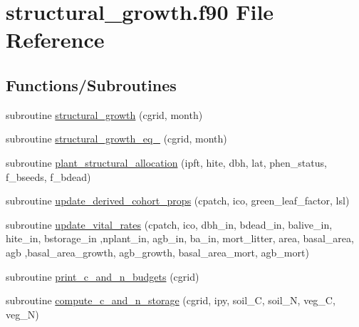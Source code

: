 \hypertarget{structural__growth_8f90}{}\section{structural\+\_\+growth.\+f90 File Reference}
\label{structural__growth_8f90}
\subsection*{Functions/\+Subroutines}
\begin{DoxyCompactItemize}
\item 
subroutine \hyperlink{structural__growth_8f90_a7026b36ce655ecfb0b39b37725e7cba0}{structural\+\_\+growth} (cgrid, month)
\item 
subroutine \hyperlink{structural__growth_8f90_ab7a103c1eca3dc4a1e6646ae50385192}{structural\+\_\+growth\+\_\+eq\+\_} (cgrid, month)
\item 
subroutine \hyperlink{structural__growth_8f90_aeb0b1265e38d3c5ca8e55da40e42dae2}{plant\+\_\+structural\+\_\+allocation} (ipft, hite, dbh, lat, phen\+\_\+status, f\+\_\+bseeds, f\+\_\+bdead)
\item 
subroutine \hyperlink{structural__growth_8f90_a536c2986535dd42c3f2fd77510acf2f3}{update\+\_\+derived\+\_\+cohort\+\_\+props} (cpatch, ico, green\+\_\+leaf\+\_\+factor, lsl)
\item 
subroutine \hyperlink{structural__growth_8f90_a18746b03d74909fea238e464b0f7f513}{update\+\_\+vital\+\_\+rates} (cpatch, ico, dbh\+\_\+in, bdead\+\_\+in, balive\+\_\+in, hite\+\_\+in, bstorage\+\_\+in                                                                                                                               ,nplant\+\_\+in, agb\+\_\+in, ba\+\_\+in, mort\+\_\+litter, area, basal\+\_\+area, agb                                                                                                                                       ,basal\+\_\+area\+\_\+growth, agb\+\_\+growth, basal\+\_\+area\+\_\+mort, agb\+\_\+mort)
\item 
subroutine \hyperlink{structural__growth_8f90_a7f0c8e66b7972204c83052c3968c4bff}{print\+\_\+c\+\_\+and\+\_\+n\+\_\+budgets} (cgrid)
\item 
subroutine \hyperlink{structural__growth_8f90_a5e03a88fee4cb247574e235c96e27716}{compute\+\_\+c\+\_\+and\+\_\+n\+\_\+storage} (cgrid, ipy, soil\+\_\+C, soil\+\_\+N, veg\+\_\+C, veg\+\_\+N)
\end{DoxyCompactItemize}


